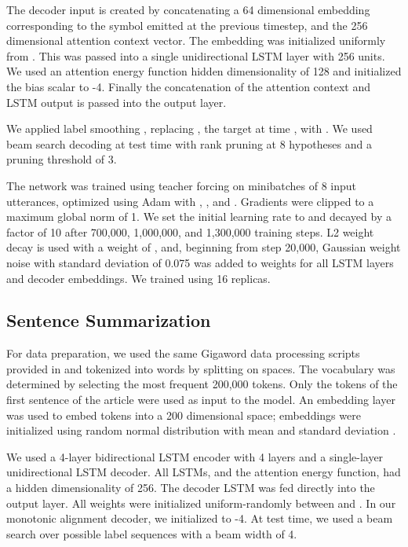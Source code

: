 \documentclass{article}
\begin{document}
The decoder input is created by concatenating a 64 dimensional embedding corresponding to the symbol emitted at the previous timestep, and the 256 dimensional attention context vector.
The embedding was initialized uniformly from .
This was passed into a single unidirectional LSTM layer with 256 units.
We used an attention energy function hidden dimensionality of 128 and initialized the bias scalar  to -4.
Finally the concatenation of the attention context and LSTM output is passed into the  output layer.

We applied label smoothing , replacing , the target at time , with .
We used beam search decoding at test time with rank pruning at 8 hypotheses and a pruning threshold of 3.

The network was trained using teacher forcing on minibatches of 8 input utterances, optimized using Adam  with , , and .
Gradients were clipped to a maximum global norm of 1.
We set the initial learning rate to  and decayed by a factor of 10 after 700,000, 1,000,000, and 1,300,000 training steps.
L2 weight decay is used with a weight of , and, beginning from step 20,000, Gaussian weight noise with standard deviation of 0.075 was added to weights for all LSTM layers and decoder embeddings.
We trained using 16 replicas.

\subsection{Sentence Summarization}

For data preparation, we used the same Gigaword data processing scripts provided in  and tokenized into words by splitting on spaces.
The vocabulary was determined by selecting the most frequent 200,000 tokens.
Only the tokens of the first sentence of the article were used as input to the model.
An embedding layer was used to embed tokens into a 200 dimensional space; embeddings were initialized using random normal distribution with mean  and standard deviation .

We used a 4-layer bidirectional LSTM encoder with 4 layers and a single-layer unidirectional LSTM decoder.
All LSTMs, and the attention energy function, had a hidden dimensionality of 256.
The decoder LSTM was fed directly into the  output layer.
All weights were initialized uniform-randomly between  and .
In our monotonic alignment decoder, we initialized  to -4.
At test time, we used a beam search over possible label sequences with a beam width of 4.
\end{document}
